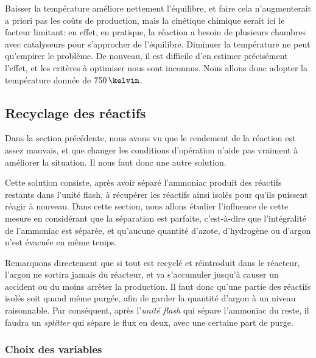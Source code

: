 Baisser la température améliore nettement l'équilibre,
et faire cela n'augmenterait a priori pas les coûts de production,
mais la cinétique chimique serait ici le facteur limitant:
en effet, en pratique, la réaction a besoin de plusieurs chambres
avec catalyseurs pour s'approcher de l'équilibre.
Diminuer la température ne peut qu'empirer le problème.
De nouveau, il est difficile d'en estimer précisément l'effet,
et les critères à optimiser nous sont inconnus.
Nous allons donc adopter la température donnée de $750\,\kelvin$.

\subsection{Recyclage des réactifs}

Dans la section précédente, nous avons vu que le rendement de la réaction
est assez mauvais, et que changer les conditions d'opération n'aide pas
vraiment à améliorer la situation.
Il nous faut donc une autre solution.

Cette solution consiste, après avoir séparé l'ammoniac produit
des réactifs restants dans l'unité flash,
à récupérer les réactifs ainsi isolés pour
qu'ils puissent réagir à nouveau.
Dans cette section, nous allons étudier l'influence de cette
mesure en considérant que la séparation est parfaite, c'est-à-dire que
l'intégralité de l'ammoniac est séparée, et qu'aucune quantité d'azote,
d'hydrogène ou d'argon n'est évacuée en même temps.

Remarquons directement que si tout est recyclé et réintroduit dans le
réacteur, l'argon ne sortira jamais du réacteur, et va s'accumuler
jusqu'à causer un accident ou du moins arrêter la production.
Il faut donc qu'une partie des réactifs isolés soit quand même
purgée, afin de garder la quantité d'argon à un niveau raisonnable.
Par conséquent, après l'\emph{unité flash} qui sépare l'ammoniac du reste,
il faudra un \emph{splitter} qui sépare le flux en deux,
avec une certaine part de purge.

\subsubsection{Choix des variables}

